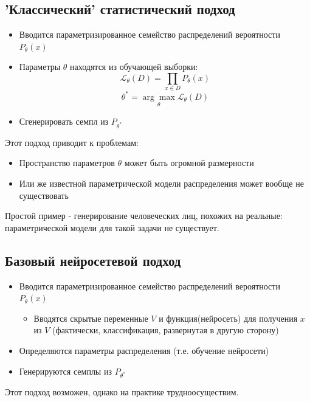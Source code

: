 \documentclass[a4paper]{article}
\begin{document}
		\subsection{'Классический' статистический подход}
			\begin{itemize}
				\item Вводится параметризированное семейство распределений вероятности $P_{\theta}(x)$
				\item Параметры $\theta$ находятся из обучающей выборки:
				$$ \mathcal{L}_{\theta}(D) = \prod_{x \in D} P_{\theta}(x) $$
				$$ \theta^{*} = \underset{\theta}{\arg\max} \mathcal{L}_{\theta}(D)$$
				\item Сгенерировать семпл из $ P_{\theta^{*}}$
			\end{itemize}
			Этот подход приводит к проблемам:
			\begin{itemize}
				\item Пространство параметров $\theta$ может быть огромной размерности
				\item Или же известной параметрической модели распределения может вообще не существовать
			\end{itemize}
			Простой пример - генерирование человеческих лиц, похожих на реальные: параметрической модели для такой задачи не существует.
		\subsection{Базовый нейросетевой подход}
			\begin{itemize}
				\item Вводится параметризированное семейство распределений вероятности $P_{\theta}(x)$
				\begin{itemize}
					\item Вводятся скрытые переменные $V$ и функция(нейросеть) для получения $x$ из $V$ (фактически, классификация, развернутая в другую сторону)
				\end{itemize}
				\item Определяются параметры распределения (т.е. обучение нейросети)
				\item Генерируются семплы из $ P_{\theta^{*}}$
			\end{itemize}
			Этот подход возможен, однако на практике трудноосуществим.
\end{document}
